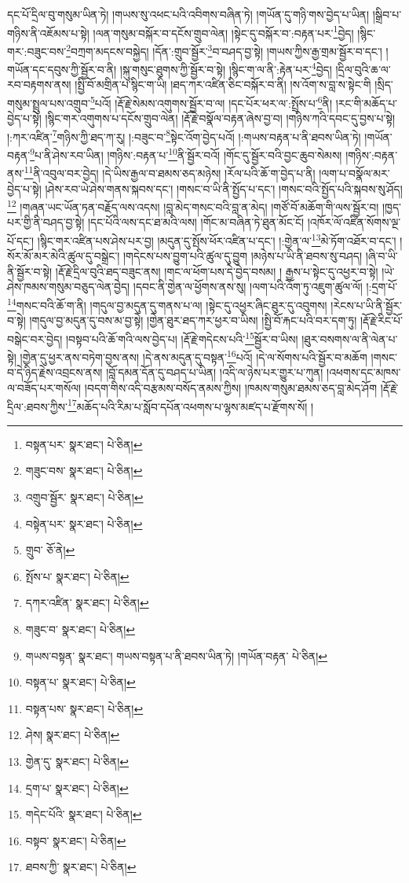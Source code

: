 དང་པོ་དྲིལ་བུ་གསུམ་ཡིན་ཏེ། །གཡས་སུ་འཕང་པའི་འབིགས་བཞིན་ཏེ། །གཡོན་དུ་གཉི་གས་བྱེད་པ་ཡིན། །སྒྲིབ་པ་གཉིས་ནི་འཇོམས་པ་སྟེ། །ལན་གསུམ་བསྐོར་བ་དངོས་གྲུབ་ལེན། །སྟེང་དུ་བསྐོར་བ་:བརྟན་པར་\footnote{བསྟན་པར་  སྣར་ཐང་།  པེ་ཅིན། }བྱེད། །སྙིང་གར་:བཟུང་བས་\footnote{གཟུང་བས་  སྣར་ཐང་།  པེ་ཅིན། }བཀྲག་མདངས་བསྐྱེད། །དོན་:གྲུབ་སྦྱོར་\footnote{འགྲུབ་སྦྱོར་  སྣར་ཐང་།  པེ་ཅིན། }བ་བཤད་བྱ་སྟེ། །གཡས་ཀྱིས་རྒྱ་གྲམ་སྦྱོར་བ་དང་། །གཡོན་དང་དབུས་ཀྱི་སྦྱོར་བ་ནི། །སྐུ་གསུང་ཐུགས་ཀྱི་སྦྱོར་བ་སྟེ། །སྙིང་ག་ལ་ནི་:རྟེན་པར་\footnote{བསྟེན་པར་  སྣར་ཐང་།  པེ་ཅིན། }བྱེད། །དྲིལ་བུའི་ཆ་ལ་རབ་བརྟགས་ནས། །སྤྱི་བོ་མགྲིན་པ་སྙིང་ག་ཡི། །ཐད་ཀར་འཛིན་ཅིང་བསྐོར་བ་ནི། །ས་འོག་ས་བླ་ས་སྟེང་གི །སྲིད་གསུམ་སྤྲུལ་པས་འགྲུབ་\footnote{གྲུབ་  ཅོ་ནེ། }པའོ། །རྡོ་རྗེ་སེམས་འགུགས་སྦྱོར་བ་ལ། །དང་པོར་ཕར་ལ་:སྤྲོས་པ་\footnote{སྤོས་པ་  སྣར་ཐང་།  པེ་ཅིན། }ནི། །རང་གི་མཆོད་པ་བྱེད་པ་སྟེ། །སྙིང་གར་འགུགས་པ་དངོས་གྲུབ་ལེན། །རྡོ་རྗེ་བསྣོལ་བརྟན་ཞེས་བྱ་བ། །གཉིས་ཀའི་དབང་དུ་བྱས་པ་སྟེ། །:ཀར་འཛིན་\footnote{དཀར་འཛིན་  སྣར་ཐང་།  པེ་ཅིན། }གཉིས་ཀྱི་ཐད་ཀ་རུ། །:བཟུང་བ་\footnote{གཟུང་བ་  སྣར་ཐང་།  པེ་ཅིན། }སྟེང་འོག་བྱེད་པའོ། །:གཡས་བརྟན་པ་ནི་ཐབས་ཡིན་ཏེ། །གཡོན་བརྟན་\footnote{གཡས་བསྟན་  སྣར་ཐང་། གཡས་བསྟན་པ་ནི་ཐབས་ཡིན་ཏེ། །གཡོན་བརྟན་  པེ་ཅིན། }པ་ནི་ཤེས་རབ་ཡིན། །གཉིས་:བརྟན་པ་\footnote{བསྟན་པ་  སྣར་ཐང་།  པེ་ཅིན། }ནི་སྦྱོར་བའོ། །གོང་དུ་སྦྱོར་བའི་བྱང་ཆུབ་སེམས། །གཉིས་:བརྟན་ནས་\footnote{བསྟན་པས་  སྣར་ཐང་།  པེ་ཅིན། }ནི་འབུལ་བར་བྱེད། །དེ་ཡིས་རྒྱལ་བ་ཐམས་ཅད་མཉེས། །རོལ་པའི་ཆོ་ག་བྱེད་པ་ནི། །ལག་པ་བསྣོལ་མར་བྱེད་པ་སྟེ། །ཤེས་རབ་ཡེ་ཤེས་གནས་སྐབས་དང་། །གསང་བ་ཡི་ནི་སྤྱོད་པ་དང་། །གསང་བའི་སྤྱོད་པའི་སྐབས་སུ་ཤོད།\footnote{ཤེས།  སྣར་ཐང་།  པེ་ཅིན། } །གཞན་ཡང་ཡོན་ཏན་བརྗོད་ལས་འདས། །བླ་མེད་གསང་བའི་བླ་ན་མེད། །གཙོ་བོ་མཆོག་གི་ལས་སྦྱོར་བ། །ཁྱད་པར་གྱི་ནི་བཤད་བྱ་སྟེ། །དང་པོའི་ལས་དང་ཐ་མའི་ལས། །གོང་མ་བཞིན་ཏེ་ཐུན་མོང་ངོ། །འཁོར་ལོ་འཛིན་སོགས་ལྔ་པོ་དང་། །སྙིང་གར་འཛིན་པས་ཤེས་པར་བྱ། །མདུན་དུ་སྤོས་ཕོར་འཛིན་པ་དང་། །:གྱེན་ལ་\footnote{གྱེན་དུ་  སྣར་ཐང་།  པེ་ཅིན། }མེ་ཏོག་འཐོར་བ་དང་། །སོར་མོ་མར་མེའི་ཚུལ་དུ་བསྒྲེང་། །གདེངས་པས་བྱུག་པའི་ཚུལ་དུ་བྱུག །མཉེས་པ་ཡི་ནི་ཐབས་སུ་བཤད། །ཞི་བ་ཡི་ནི་སྦྱོར་བ་སྟེ། །རྡོ་རྗེ་དྲིལ་བུའི་ཐད་བཟུང་ནས། །གང་ལ་ཕོག་པས་དེ་བྱེད་བསམ། །
རྒྱས་པ་སྟེང་དུ་འཕྱར་བ་སྟེ། །ཡེ་ཤེས་ཁམས་གསུམ་བཅུད་ལེན་བྱེད། །དབང་ནི་གྱེན་ལ་ཕྱོགས་ནས་སུ། །ལག་པའི་འོག་ཏུ་འཇུག་ཚུལ་ལོ། །:དྲག་པོ་\footnote{དྲག་པ་  སྣར་ཐང་།  པེ་ཅིན། }གསང་བའི་ཆོ་ག་ནི། །གདུལ་བྱ་མདུན་དུ་གནས་པ་ལ། །སྟེང་དུ་འཕྱར་ཞིང་ཐུར་དུ་འབུགས། །རེངས་པ་ཡི་ནི་སྦྱོར་བ་སྟེ། །གདུལ་བྱ་མདུན་དུ་བས་མ་བྱ་སྟེ། །གྱེན་ཐུར་ཐད་ཀར་ཕྱར་བ་ཡིས། །སྤྱི་བོ་རྐང་པའི་བར་དག་ཏུ། །རྡོ་རྗེ་རིང་པོ་བསྒེང་བར་བྱེད། །བསྟབ་པའི་ཆོ་གའི་ལས་བྱེད་པ། །རྡོ་རྗེ་གདེངས་པའི་\footnote{གདེང་པོའི་  སྣར་ཐང་།  པེ་ཅིན། }སྦྱོར་བ་ཡིས། །ཐུར་བསགས་ལ་ནི་ལེན་པ་སྟེ། །གྱེན་དུ་ཕྱར་ནས་བཏེག་བྱས་ནས། །དེ་ནས་མདུན་དུ་བསྟན་\footnote{བསྟབ་  སྣར་ཐང་།  པེ་ཅིན། }པའོ། །དེ་ལ་སོགས་པའི་སྦྱོར་བ་མཆོག །གསང་བ་དེ་ཉིད་རྗེས་འབྲངས་ནས། །བློ་དམན་དོན་དུ་བཤད་པ་ཡིན། །འདི་ལ་ཉེས་པར་གྱུར་པ་ཀུན། །འཕགས་དང་མཁས་ལ་བཟོད་པར་གསོལ། །བདག་གིས་འདི་བརྩམས་བསོད་ནམས་ཀྱིས། །ཁམས་གསུམ་ཐམས་ཅད་བླ་མེད་ཤོག །རྡོ་རྗེ་དྲིལ་:ཐབས་ཀྱིས་\footnote{ཐབས་ཀྱི་  སྣར་ཐང་།  པེ་ཅིན། }མཆོད་པའི་རིམ་པ་སློབ་དཔོན་འཕགས་པ་ལྷས་མཛད་པ་རྫོགས་སོ། ། 